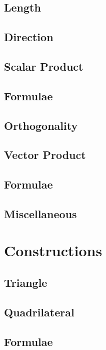 \documentclass[journal]{IEEEtran}
\begin{document}
\subsection{Length}

%
\subsection{Direction}

\subsection{Scalar Product}

\subsection{Formulae}

\subsection{Orthogonality}

\subsection{Vector Product}

\subsection{Formulae}

\subsection{Miscellaneous}

\newpage
\section{Constructions}
\subsection{Triangle}

\subsection{Quadrilateral}

\subsection{Formulae}

\newpage
\end{document}

